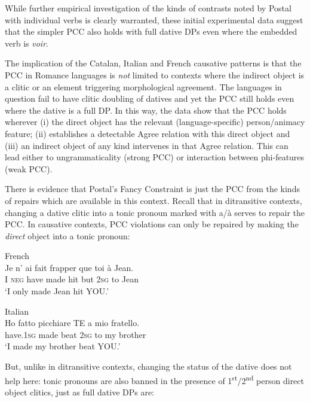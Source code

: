 \documentclass[output=paper,colorlinks,citecolor=brown,nonflat]{langsci/langscibook}
\begin{document}
While further empirical investigation of the kinds of contrasts noted by Postal with individual verbs is clearly warranted, these initial experimental data suggest that the simpler PCC also holds with full dative DPs even where the embedded verb is \textit{voir}.

The implication of the Catalan, Italian and French causative patterns is that the PCC in Romance languages is \textit{not} limited to contexts where the indirect object is a clitic or an element triggering morphological agreement. The languages in question fail to have clitic doubling of datives and yet the PCC still holds even where the dative is a full DP. In this way, the data show that the PCC holds wherever (i) the direct object has the relevant (language-specific) person/animacy feature; (ii) \liv establishes a detectable Agree relation with this direct object and (iii) an indirect object of any kind intervenes in that Agree relation. This can lead either to ungrammaticality (strong PCC) or interaction between phi-features (weak PCC).

There is evidence that Postal’s Fancy Constraint is just the PCC from the kinds of repairs which are available in this context. Recall that in ditransitive contexts, changing a dative clitic into a tonic pronoun marked with a/à serves to repair the PCC. In causative contexts, PCC violations can only be repaired by making the \textit{direct} object into a tonic pronoun:

\ea%
    \label{ex:sheehan:26}
    French\\
    \gll    Je   n’  ai   fait   frapper   que   toi   à   Jean.\\
            I   \textsc{neg}   have   made   hit   but   2\textsc{sg}   to   Jean\\
    \glt    ‘I only made Jean hit YOU.’
\z

\ea%
    \label{ex:sheehan:27}
    Italian\\
    \gll    Ho       fatto   picchiare   TE  a  mio  fratello.\\
            have.\textsc{1sg}   made   beat  2\textsc{sg}   to  my  brother\\
    \glt    ‘I made my brother beat YOU.’
\z

But, unlike in ditransitive contexts, changing the status of the dative does not help here: tonic pronouns are also banned in the presence of 1\textsuperscript{st}/2\textsuperscript{nd} person direct object clitics, just as full dative DPs are:
\end{document}
